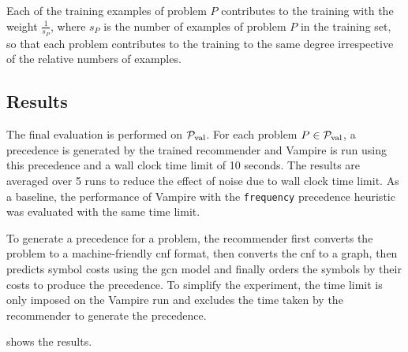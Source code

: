 Each of the training examples of problem $P$ contributes to the training with the weight $\frac{1}{s_P}$,
where $s_P$ is the number of examples of problem $P$ in the training set,
so that each problem contributes to the training to the same degree irrespective of the relative numbers of examples.

\subsection{Results}

The final evaluation is performed on $\operatorname{\mathcal{P}_{\mathrm{val}}}$.
For each problem $P \in \operatorname{\mathcal{P}_{\mathrm{val}}}$,
a precedence is generated by the trained recommender
and Vampire is run using this precedence and a wall clock time limit of 10 seconds.
The results are averaged over 5 runs to reduce the effect of noise due to wall clock time limit.
As a baseline, the performance of Vampire with the \texttt{frequency} precedence heuristic was evaluated
with the same time limit.

To generate a precedence for a problem,
the recommender first converts the problem to a machine-friendly \gls{cnf} format,
then converts the \gls{cnf} to a graph,
then predicts symbol costs using the \gls{gcn} model
and finally orders the symbols by their costs to produce the precedence.
To simplify the experiment, the time limit is only imposed on the Vampire run
and excludes the time taken by the recommender to generate the precedence.

 shows the results.

